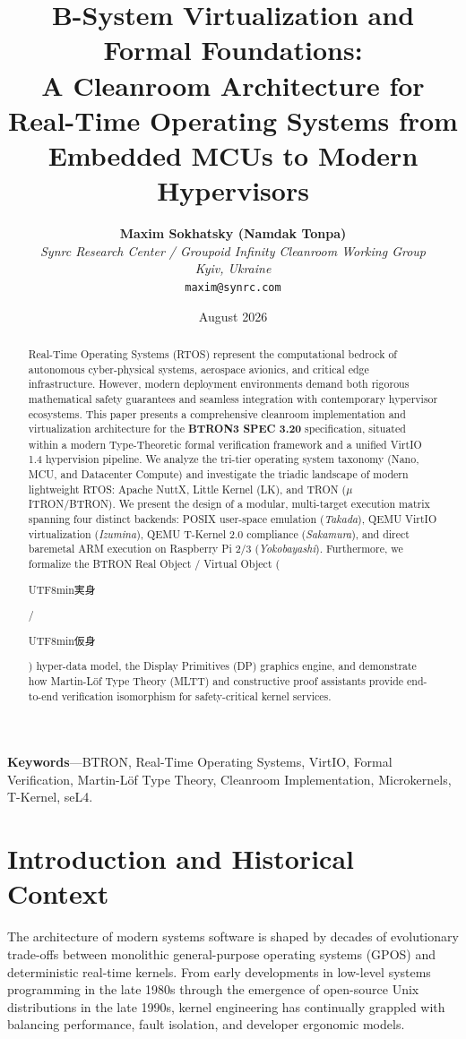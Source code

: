 \documentclass[10pt,journal,compsoc,twocolumn]{article}
\title{\LARGE \textbf{B-System Virtualization and Formal Foundations:\\A Cleanroom Architecture for Real-Time Operating Systems from Embedded MCUs to Modern Hypervisors}}
\author{
    \textbf{Maxim Sokhatsky (Namdak Tonpa)}\\[0.3em]
    \small \textit{Synrc Research Center / Groupoid Infinity Cleanroom Working Group}\\
    \small \textit{Kyiv, Ukraine}\\
    \small \texttt{maxim@synrc.com}
}
\date{August 2026}
\newcommand{\ja}[1]{\begin{CJK*}{UTF8}{min}#1\end{CJK*}}
\begin{document}
\maketitle

\begin{abstract}
Real-Time Operating Systems (RTOS) represent the computational bedrock of autonomous cyber-physical systems, aerospace avionics, and critical edge infrastructure. However, modern deployment environments demand both rigorous mathematical safety guarantees and seamless integration with contemporary hypervisor ecosystems. This paper presents a comprehensive cleanroom implementation and virtualization architecture for the \textbf{BTRON3 SPEC 3.20} specification, situated within a modern Type-Theoretic formal verification framework and a unified VirtIO 1.4 hypervision pipeline. We analyze the tri-tier operating system taxonomy (Nano, MCU, and Datacenter Compute) and investigate the triadic landscape of modern lightweight RTOS: Apache NuttX, Little Kernel (LK), and TRON ($\mu$ITRON/BTRON). We present the design of a modular, multi-target execution matrix spanning four distinct backends: POSIX user-space emulation (\emph{Takada}), QEMU VirtIO virtualization (\emph{Izumina}), QEMU T-Kernel 2.0 compliance (\emph{Sakamura}), and direct baremetal ARM execution on Raspberry Pi 2/3 (\emph{Yokobayashi}). Furthermore, we formalize the BTRON Real Object / Virtual Object (\ja{実身}/\ja{仮身}) hyper-data model, the Display Primitives (DP) graphics engine, and demonstrate how Martin-Löf Type Theory (MLTT) and constructive proof assistants provide end-to-end verification isomorphism for safety-critical kernel services.
\end{abstract}

\noindent\textbf{\small Keywords}---BTRON, Real-Time Operating Systems, VirtIO, Formal Verification, Martin-Löf Type Theory, Cleanroom Implementation, Microkernels, T-Kernel, seL4.

\section{Introduction and Historical Context}
\label{sec:intro}

The architecture of modern systems software is shaped by decades of evolutionary trade-offs between monolithic general-purpose operating systems (GPOS) and deterministic real-time kernels. From early developments in low-level systems programming in the late 1980s through the emergence of open-source Unix distributions in the late 1990s, kernel engineering has continually grappled with balancing performance, fault isolation, and developer ergonomic models.
\end{document}
